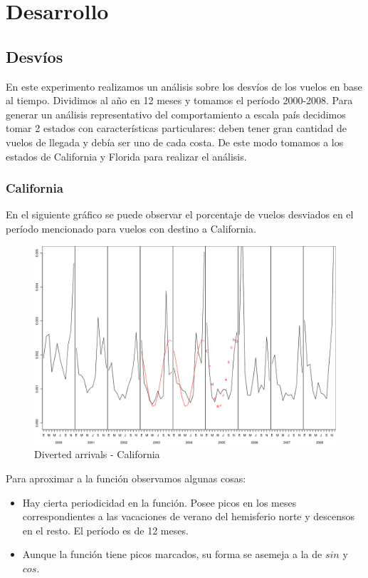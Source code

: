 \section{Desarrollo}
\subsection{Desv\'ios}

En este experimento realizamos un an\'alisis sobre los desv\'ios de los vuelos en base al tiempo. Dividimos al año en 12 meses y tomamos el per\'iodo 2000-2008. Para generar un an\'alisis representativo del comportamiento a escala pa\'is decidimos tomar 2 estados con caracter\'isticas particulares: deben tener gran cantidad de vuelos de llegada y deb\'ia ser uno de cada costa. De este modo tomamos a los estados de California y Florida para realizar el an\'alisis.

\subsubsection{California}

En el siguiente gr\'afico se puede observar el porcentaje de vuelos desviados en el per\'iodo mencionado para vuelos con destino a California.

\begin{figure}[h!]
  \begin{center}
	\includegraphics[scale=0.4]{img/plot_CA_2003-2005.png}
	\caption{Diverted arrivals - California}
  \end{center}
\end{figure}

Para aproximar a la funci\'on observamos algunas cosas:
\begin{itemize}  
\item Hay cierta periodicidad en la funci\'on. Posee picos en los meses correspondientes a las vacaciones de verano del hemisferio norte y descensos en el resto. El per\'iodo es de 12 meses.
\item Aunque la funci\'on tiene picos marcados, su forma se asemeja a la de $sin$ y $cos$.
\end{itemize}

